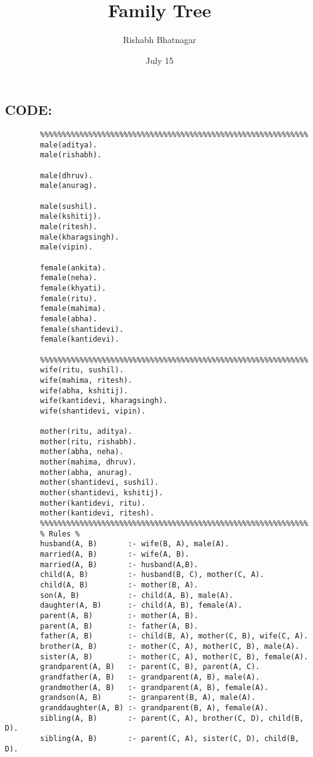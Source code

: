 \documentclass{article}
\title{\textbf{Family Tree}}
\author{Rishabh Bhatnagar}
\date{July 15}
\begin{document}
    \begin{titlepage}
        \maketitle

        \section{CODE:}
        \begin{verbatim}
        %%%%%%%%%%%%%%%%%%%%%%%%%%%%%%%%%%%%%%%%%%%%%%%%%%%%%%%%%%%%%
        male(aditya).
        male(rishabh).

        male(dhruv).
        male(anurag).

        male(sushil).
        male(kshitij).
        male(ritesh).
        male(kharagsingh).
        male(vipin).

        female(ankita).
        female(neha).
        female(khyati).
        female(ritu).
        female(mahima).
        female(abha).
        female(shantidevi).
        female(kantidevi).
        
        %%%%%%%%%%%%%%%%%%%%%%%%%%%%%%%%%%%%%%%%%%%%%%%%%%%%%%%%%%%%%
        wife(ritu, sushil).
        wife(mahima, ritesh).
        wife(abha, kshitij).
        wife(kantidevi, kharagsingh).
        wife(shantidevi, vipin).

        mother(ritu, aditya).
        mother(ritu, rishabh).
        mother(abha, neha).
        mother(mahima, dhruv).
        mother(abha, anurag).
        mother(shantidevi, sushil).
        mother(shantidevi, kshitij).
        mother(kantidevi, ritu).
        mother(kantidevi, ritesh).
        %%%%%%%%%%%%%%%%%%%%%%%%%%%%%%%%%%%%%%%%%%%%%%%%%%%%%%%%%%%%%
        % Rules %
        husband(A, B)       :- wife(B, A), male(A).
        married(A, B)       :- wife(A, B).
        married(A, B)       :- husband(A,B).
        child(A, B)         :- husband(B, C), mother(C, A).
        child(A, B)         :- mother(B, A).
        son(A, B)           :- child(A, B), male(A).
        daughter(A, B)      :- child(A, B), female(A).
        parent(A, B)        :- mother(A, B).
        parent(A, B)        :- father(A, B).
        father(A, B)        :- child(B, A), mother(C, B), wife(C, A).
        brother(A, B)       :- mother(C, A), mother(C, B), male(A).
        sister(A, B)        :- mother(C, A), mother(C, B), female(A).
        grandparent(A, B)   :- parent(C, B), parent(A, C).
        grandfather(A, B)   :- grandparent(A, B), male(A).
        grandmother(A, B)   :- grandparent(A, B), female(A).
        grandson(A, B)      :- granparent(B, A), male(A).
        granddaughter(A, B) :- grandparent(B, A), female(A).
        sibling(A, B)       :- parent(C, A), brother(C, D), child(B, D).
        sibling(A, B)       :- parent(C, A), sister(C, D), child(B, D).
        \end{verbatim}


\end{titlepage}
\end{document}
